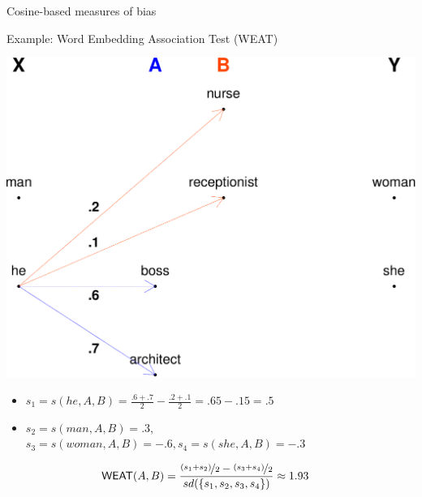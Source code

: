 \documentclass[10pt,ignorenonframetext,x11names, dvipsnames, bibspacing,natbib]{beamer}
\begin{document}
\begin{frame}{Cosine-based measures of bias}
\protect\hypertarget{cosine-based-measures-of-bias-4}{}

\begin{block}{Example: Word Embedding Association Test (WEAT)}

\vspace{1mm}
\footnotesize

\begin{center}\includegraphics[width=0.55\linewidth]{presentationESSLLI_files/figure-beamer/unnamed-chunk-2-1} \end{center}
\normalsize

\pause

\footnotesize

\begin{itemize}
\item
  \(s_1 = s(he,A,B) = \frac{.6+.7}{2} - \frac{.2+.1}{2} = .65-.15= .5\)
\item
  \(s_2 = s(man,A,B) = .3\),
  \linebreak  \(s_3 = s(woman,A,B) = -.6, s_4 = s(she, A, B) = -.3\)
\end{itemize}

\vspace{-4mm}

\normalsize

\begin{align*}
\mathsf{WEAT}(A,B) & = \frac{\nicefrac{(s_1+s_2)}{2} - \nicefrac{(s_3+s_4)}{2}}{sd(\{s_1,s_2,s_3,s_4\})} \approx 1.93
\end{align*}

\end{block}

\end{frame}
\end{document}
